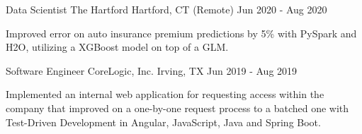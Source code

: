\begin{cventries}

\cventry
{Data Scientist} %
{The Hartford} %
{Hartford, CT (Remote)} %
{Jun 2020 - Aug 2020} %
{ %
\begin{cvitems}
\item {Improved error on auto insurance premium predictions by 5\% with PySpark and H2O, utilizing a XGBoost model on top of a GLM.}
\end{cvitems} 
}


\cventry
{Software Engineer} %
{CoreLogic, Inc.} %
{Irving, TX} %
{Jun 2019 - Aug 2019} %
{ %
\begin{cvitems}
\item {Implemented an internal web application for requesting access within the company that improved on a one-by-one request process to a batched one with Test-Driven Development in Angular, JavaScript, Java and Spring Boot.}
\end{cvitems}
}


\end{cventries}